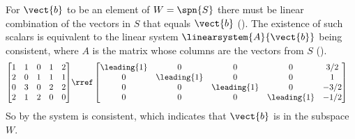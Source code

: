 For $\vect{b}$ to be an element of $W=\spn{S}$ there must be linear combination of the vectors in $S$ that equals $\vect{b}$ ().  The existence of such scalars is equivalent to the linear system $\linearsystem{A}{\vect{b}}$ being consistent, where $A$ is the matrix whose columns are the vectors from $S$ ().
%
\begin{align*}
\begin{bmatrix} 
1 & 1 & 0 & 1 & 2\\
2 & 0 & 1 & 1 & 1\\
0 & 3 & 0 & 2 & 2\\
2 & 1 & 2 & 0 & 0
\end{bmatrix} 
&\rref
\begin{bmatrix} 
\leading{1} & 0 & 0 & 0 & 3/2\\ 
0 & \leading{1} & 0 & 0 & 1\\ 
0 & 0 & \leading{1} & 0 & -3/2 \\
0 & 0 & 0& \leading{1} & -1/2
\end{bmatrix}
\end{align*}
%
So by  the system is consistent, which indicates that $\vect{b}$ is in the subspace $W$.